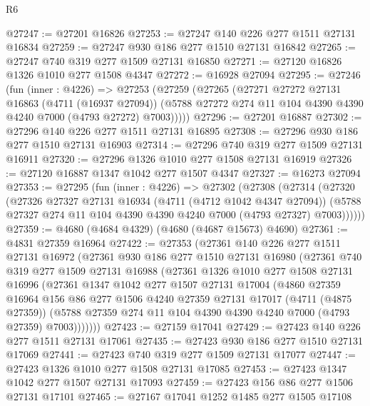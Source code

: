 \begin{lexlean}{R6}
\begin{coremodule}
@27247 := @27201 @16826
@27253 := @27247 @140 @226 @277 @1511 @27131 @16834
@27259 := @27247 @930 @186 @277 @1510 @27131 @16842
@27265 := @27247 @740 @319 @277 @1509 @27131 @16850
@27271 := @27120 @16826 @1326 @1010 @277 @1508 @4347
@27272 := @16928 @27094
@27295 := @27246
    (fun (inner : @4226) =>
    @27253
      (@27259
        (@27265
          (@27271
            @27272
            @27131
            @16863
            (@4711 (@16937 @27094))
            (@5788 @27272 @274 @11 @104 @4390 @4390 @4240 @7000 (@4793 @27272) @7003)))))
@27296 := @27201 @16887
@27302 := @27296 @140 @226 @277 @1511 @27131 @16895
@27308 := @27296 @930 @186 @277 @1510 @27131 @16903
@27314 := @27296 @740 @319 @277 @1509 @27131 @16911
@27320 := @27296 @1326 @1010 @277 @1508 @27131 @16919
@27326 := @27120 @16887 @1347 @1042 @277 @1507 @4347
@27327 := @16273 @27094
@27353 := @27295
    (fun (inner : @4226) =>
    @27302
      (@27308
        (@27314
          (@27320
            (@27326
              @27327
              @27131
              @16934
              (@4711 (@4712 @1042 @4347 @27094))
              (@5788 @27327 @274 @11 @104 @4390 @4390 @4240 @7000 (@4793 @27327) @7003))))))
@27359 := @4680 (@4684 @4329) (@4680 (@4687 @15673) @4690)
@27361 := @4831 @27359 @16964
@27422 := @27353
    (@27361
      @140
      @226
      @277
      @1511
      @27131
      @16972
      (@27361
        @930
        @186
        @277
        @1510
        @27131
        @16980
        (@27361
          @740
          @319
          @277
          @1509
          @27131
          @16988
          (@27361
            @1326
            @1010
            @277
            @1508
            @27131
            @16996
            (@27361
              @1347
              @1042
              @277
              @1507
              @27131
              @17004
              (@4860
                @27359
                @16964
                @156
                @86
                @277
                @1506
                @4240
                @27359
                @27131
                @17017
                (@4711 (@4875 @27359))
                (@5788 @27359 @274 @11 @104 @4390 @4390 @4240 @7000 (@4793 @27359) @7003)))))))
@27423 := @27159 @17041
@27429 := @27423 @140 @226 @277 @1511 @27131 @17061
@27435 := @27423 @930 @186 @277 @1510 @27131 @17069
@27441 := @27423 @740 @319 @277 @1509 @27131 @17077
@27447 := @27423 @1326 @1010 @277 @1508 @27131 @17085
@27453 := @27423 @1347 @1042 @277 @1507 @27131 @17093
@27459 := @27423 @156 @86 @277 @1506 @27131 @17101
@27465 := @27167 @17041 @1252 @1485 @277 @1505 @17108

\end{coremodule}
\end{lexlean}
